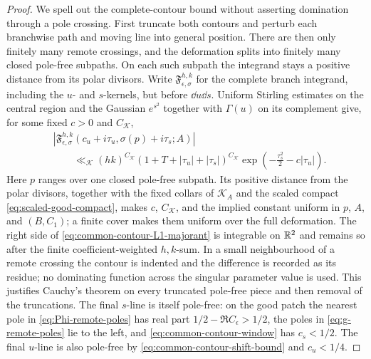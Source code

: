 \begin{proof}
We spell out the complete-contour bound without asserting domination through
a pole crossing.  First truncate both contours and perturb each branchwise
 path and moving line into general position.  There are then only finitely many
 remote crossings, and the deformation splits into finitely many closed
 pole-free subpaths.  On each such subpath the integrand stays a positive
 distance from its polar divisors.  Write $\mathfrak F_{\epsilon,\sigma}^{h,k}$
 for the complete branch integrand, including the $u$- and $s$-kernels, but
 before $\dd u\dd s$.  Uniform Stirling estimates on the central region and
 the Gaussian $e^{s^2}$ together with $\Gamma(u)$ on its complement give,
 for some fixed $c>0$ and $C_{\mathscr K}$,
 \begin{equation}\label{eq:common-contour-L1-majorant}
  \begin{aligned}
  &|\mathfrak F_{\epsilon,\sigma}^{h,k}
       (c_u+i\tau_u,\sigma(p)+i\tau_s;A)|\\
  &\qquad\ll_{\mathscr K}(hk)^{C_{\mathscr K}}
  (1+T+|\tau_u|+|\tau_s|)^{C_{\mathscr K}}
  \exp\!\left(-\frac{\tau_s^2}{2}-c|\tau_u|\right).
  \end{aligned}
 \end{equation}
 Here $p$ ranges over one closed pole-free subpath.  Its positive distance
 from the polar divisors, together with the fixed collars of
 $\mathscr K_A$ and the scaled compact \eqref{eq:scaled-good-compact}, makes
 $c$, $C_{\mathscr K}$, and the implied constant uniform in $p$, $A$, and
 $(B,C_1)$; a finite cover makes them uniform over the full deformation.
 The right side of \eqref{eq:common-contour-L1-majorant} is integrable on
 $\mathbb R^2$ and remains so after the finite coefficient-weighted $h,k$-sum.
 In a small neighbourhood of a remote
 crossing the contour is indented and the difference is recorded as its
 residue; no dominating function across the singular parameter value is used.
This justifies Cauchy's theorem on every truncated pole-free piece and then
removal of the truncations.  The final $s$-line is itself pole-free: on the
good patch the nearest pole in \eqref{eq:Phi-remote-poles} has real part
$1/2-\Re C_\epsilon>1/2$, the poles in
\eqref{eq:g-remote-poles} lie to the left, and
\eqref{eq:common-contour-window} has $c_s<1/2$.  The final $u$-line is also
pole-free by \eqref{eq:common-contour-shift-bound} and $c_u<1/4$.


\end{proof}
